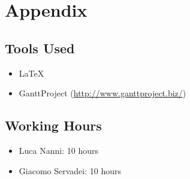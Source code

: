 \chapter{Appendix}

\section{Tools Used}
\begin{itemize}
	\item \LaTeX
	\item GanttProject (\url{http://www.ganttproject.biz/})
\end{itemize}

\section{Working Hours}
\begin{itemize}
	\item Luca Nanni: 10 hours
	\item Giacomo Servadei: 10 hours
\end{itemize}
